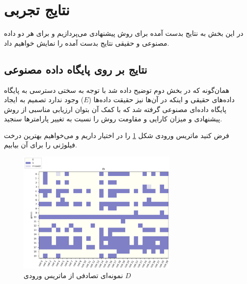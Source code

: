 %
\newpage
\section{نتایج تجربی}
در این بخش به نتایج بدست آمده برای روش پیشنهادی می‌پردازیم و برای هر دو داده مصنوعی و حقیقی نتایج بدست آمده را نمایش خواهیم داد.
\subsection{نتایج بر روی پایگاه داده مصنوعی}
همان‌گونه که در بخش دوم توضیح داده شد با توجه به سختی دسترسی به پایگاه داده‌های حقیقی و اینکه در آن‌ها نیز حقیقت داده‌ها ($E$) وجود ندارد تصمیم به ایجاد پایگاه داده‌ای مصنوعی گرفته شد که با کمک آن بتوان ارزیابی مناسبی از روش پیشنهادی و میزان کارایی و مقاومت روش را نسبت به تغییر پارامترها سنجید.

فرض کنید ماتریس ورودی شکل \ref{fig:sy_D1} را در اختیار داریم و می‌خواهیم بهترین درخت فیلوژنی را برای آن بیابیم.
\begin{figure}[!ht]
	\centering
	\includegraphics[width=0.7\textwidth]{img/res/D1}
	\caption{نمونه‌ای تصادفی از ماتریس ورودی $D$}
	\label{fig:sy_D1}
\end{figure}

